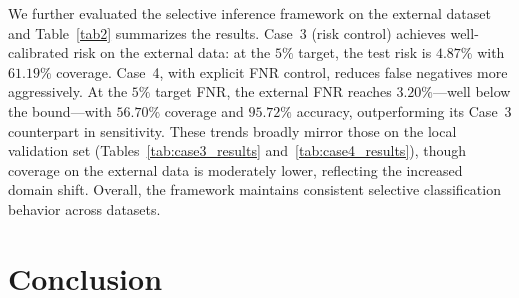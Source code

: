 \documentclass[journal,twoside,web]{ieeecolor}
\begin{document}
\begin{table}[htbp]
    \centering
    \caption{The selective classification performance of external validation.}
    \label{tab2}
    \renewcommand\arraystretch{1.2} 
\end{table}

We further evaluated the selective inference framework on the external dataset and Table~\ref{tab2} summarizes the results. Case~3 (risk control) achieves well-calibrated risk on the external data: at the $5\%$ target, the test risk is $4.87\%$ with $61.19\%$ coverage. Case~4, with explicit FNR control, reduces false negatives more aggressively. At the $5\%$ target FNR, the external FNR reaches $3.20\%$—well below the bound—with $56.70\%$ coverage and $95.72\%$ accuracy, outperforming its Case~3 counterpart in sensitivity. These trends broadly mirror those on the local validation set (Tables~\ref{tab:case3_results} and~\ref{tab:case4_results}), though coverage on the external data is moderately lower, reflecting the increased domain shift. Overall, the framework maintains consistent selective classification behavior across datasets.

\section{Conclusion}
\end{document}
